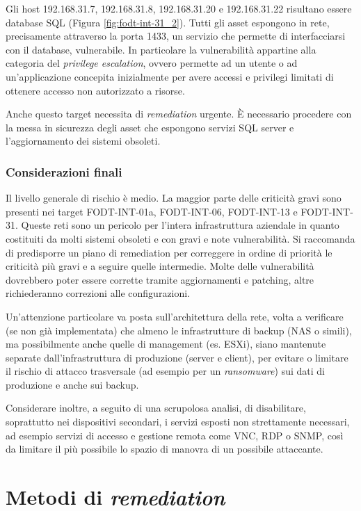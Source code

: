 \documentclass[target=bach,aauheader=]{thud}
\begin{document}
Gli host 192.168.31.7, 192.168.31.8, 192.168.31.20 e 192.168.31.22 risultano essere database SQL (Figura \ref{fig:fodt-int-31_2}). Tutti gli asset espongono in rete, precisamente attraverso la porta 1433, un servizio che permette di interfacciarsi con il database, vulnerabile. In particolare la vulnerabilità appartine alla categoria del \textit{privilege escalation}, ovvero permette ad un utente o ad un'applicazione concepita inizialmente per avere accessi e privilegi limitati di ottenere accesso non autorizzato a risorse.

Anche questo target necessita di \textit{remediation} urgente. È necessario procedere con la messa in sicurezza degli asset che espongono servizi SQL server e l'aggiornamento dei sistemi obsoleti.

\subsection{Considerazioni finali}
Il livello generale di rischio è medio. La maggior parte delle criticità gravi sono presenti nei target FODT-INT-01a, FODT-INT-06, FODT-INT-13 e FODT-INT-31. Queste reti sono un pericolo per l’intera infrastruttura aziendale in quanto costituiti da molti sistemi obsoleti e con gravi e note vulnerabilità. Si raccomanda di predisporre un piano di remediation per correggere in ordine di priorità le criticità più gravi e a seguire quelle intermedie. Molte delle vulnerabilità dovrebbero poter essere corrette tramite aggiornamenti e patching, altre richiederanno correzioni alle configurazioni.

Un’attenzione particolare va posta sull’architettura della rete, volta a verificare (se non già implementata) che almeno le infrastrutture di backup (NAS o simili), ma possibilmente anche quelle di management (es. ESXi), siano mantenute separate dall’infrastruttura di produzione (server e client), per evitare o limitare il rischio di attacco trasversale (ad esempio per un \textit{ransomware}) sui dati di produzione e anche sui backup.

Considerare inoltre, a seguito di una scrupolosa analisi, di disabilitare, soprattutto nei dispositivi secondari, i servizi esposti non strettamente necessari, ad esempio servizi di accesso e gestione remota come VNC, RDP o SNMP, così da limitare il più possibile lo spazio di manovra di un possibile attaccante.

\chapter{Metodi di \textit{remediation}}
\end{document}
